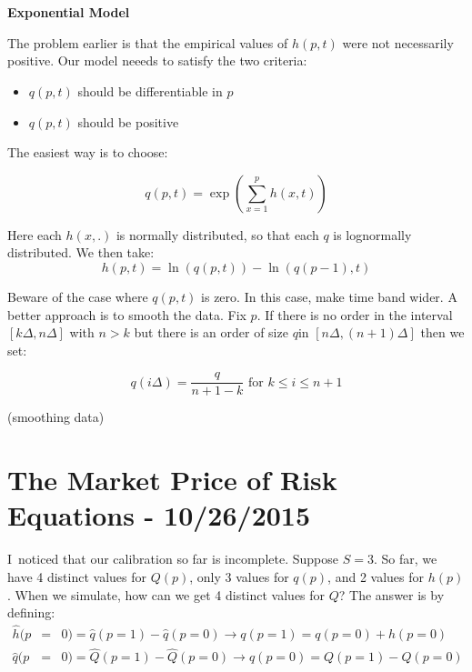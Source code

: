 \documentclass{article}
\begin{document}
\textbf{Exponential Model}

The problem earlier is that the empirical values of $\hat{h}(p,t)$ were not
necessarily positive. Our model neeeds to satisfy the two criteria:

\begin{itemize}
\item $q(p,t)$ should be differentiable in $p$

\item $q(p,t)$ should be positive
\end{itemize}

The easiest way is to choose:

\begin{equation*}
q(p,t)=\exp (\sum\limits_{x=1}^{p}h(x,t))
\end{equation*}

Here each $h(x,.)$ is normally distributed, so that each $q$ is lognormally
distributed. We then take:%
\begin{equation*}
h(p,t)=\ln (q(p,t))-\ln (q(p-1),t)
\end{equation*}

Beware of the case where $q(p,t)$ is zero. In this case, make time band
wider. A better approach is to smooth the data. Fix $p$. If there is no
order in the interval $[k\Delta ,n\Delta ]$ with $n>k$ but there is an order
of size $q$in $[n\Delta ,(n+1)\Delta ]$ then we set:

\begin{equation*}
q(i\Delta )=\frac{q}{n+1-k}\text{ for }k\leq i\leq n+1
\end{equation*}

(smoothing data)

\section{The Market Price of Risk Equations - 10/26/2015}

I\ noticed that our calibration so far is incomplete. Suppose $S=3$. So far,
we have 4 distinct values for $Q(p)$, only 3 values for $q(p)$, and 2 values
for $h(p)$. When we simulate, how can we get 4 distinct values for $Q$? The
answer is by defining:%
\begin{eqnarray*}
\hat{h}(p &=&0)=\hat{q}(p=1)-\hat{q}(p=0)\rightarrow q(p=1)=q(p=0)+h(p=0) \\
\hat{q}(p &=&0)=\hat{Q}(p=1)-\hat{Q}(p=0)\rightarrow q(p=0)=Q(p=1)-Q(p=0)
\end{eqnarray*}
\end{document}
